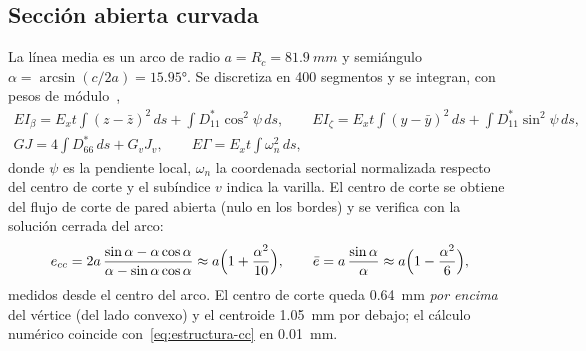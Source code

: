\subsection{Sección abierta curvada}
La línea media es un arco de radio $a=R_c=\SI{81.9}{mm}$ y semiángulo
$\alpha=\arcsin(c/2a)=\ang{15.95}$. Se discretiza en 400 segmentos y se integran, con
pesos de módulo~\cite{estructura-megson2017},
\begin{gather}
  EI_\beta=E_x t\!\int (z-\bar z)^2\,ds+\!\int D_{11}^*\cos^2\psi\,ds,\qquad
  EI_\zeta=E_x t\!\int (y-\bar y)^2\,ds+\!\int D_{11}^*\sin^2\psi\,ds,\label{eq:estructura-EI}\\
  GJ=4\!\int D_{66}^*\,ds + G_vJ_v,\qquad
  E\Gamma=E_x t\!\int \omega_n^2\,ds,\label{eq:estructura-GJ}
\end{gather}
donde $\psi$ es la pendiente local, $\omega_n$ la coordenada sectorial normalizada
respecto del centro de corte y el subíndice $v$ indica la varilla. El centro de corte se
obtiene del flujo de corte de pared abierta (nulo en los bordes) y se verifica con la
solución cerrada del arco:
\begin{equation}
  e_{cc}=2a\,\frac{\sin\alpha-\alpha\cos\alpha}{\alpha-\sin\alpha\cos\alpha}\approx
  a\Bigl(1+\frac{\alpha^2}{10}\Bigr),\qquad
  \bar e=a\,\frac{\sin\alpha}{\alpha}\approx a\Bigl(1-\frac{\alpha^2}{6}\Bigr),
  \label{eq:estructura-cc}
\end{equation}
medidos desde el centro del arco. El centro de corte queda \SI{0.64}{mm}
\emph{por encima} del vértice (del lado convexo) y el centroide \SI{1.05}{mm} por
debajo; el cálculo numérico coincide con~\eqref{eq:estructura-cc} en
\SI{0.01}{mm}.

